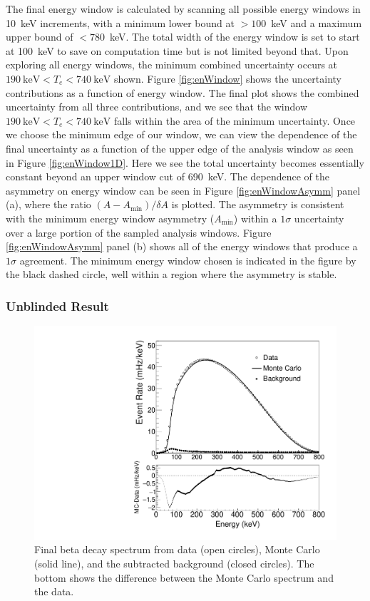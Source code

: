 The final energy window is calculated by scanning all possible energy windows in
10~keV increments, with a minimum lower bound at
$>100$~keV and a maximum upper bound of $<780$~keV. The total width of the energy window
is set to start at 100~keV to save on computation
time but is not limited beyond that. Upon exploring all energy windows, the minimum combined uncertainty
occurs at $190\mathrm{~keV} < T_e < 740\mathrm{~keV}$ shown.
Figure \ref{fig:enWindow} shows the uncertainty contributions as a function of energy window. The
final plot shows the combined uncertainty from all three contributions, and we
see that the window $190\mathrm{~keV} < T_e < 740\mathrm{~keV}$ falls within the area
of the minimum uncertainty. Once we choose the minimum edge of our window, we can view the
dependence of the final uncertainty as a function of the upper edge of the analysis window
as seen in Figure \ref{fig:enWindow1D}. Here we see the total uncertainty becomes essentially
constant beyond an upper window cut of 690~keV.
The dependence of the asymmetry on energy window can be seen in Figure \ref{fig:enWindowAsymm} panel (a),
where the ratio $(A-A_{\mathrm{min}})/\delta A$ is plotted. The asymmetry is consistent with the
minimum energy window asymmetry ($A_{\mathrm{min}}$) within
a $1\sigma$ uncertainty over a large portion of the sampled analysis windows. Figure
\ref{fig:enWindowAsymm} panel (b) shows all of the energy windows that produce a $1\sigma$ agreement.
The minimum energy window chosen is indicated in the figure by the black dashed circle, well within
a region where the asymmetry is stable.


\subsubsection{Unblinded Result}

\begin{figure}[h]
  \centering
  \includegraphics[scale=0.4]{5-UCNAResults/SuperSumTotal.pdf} 
  \caption{Final beta decay spectrum from data (open circles), Monte Carlo (solid line),
    and the subtracted background (closed circles). The bottom shows the difference between the
    Monte Carlo spectrum and the data.}
  \label{fig:FinalSpectrum}
\end{figure}

